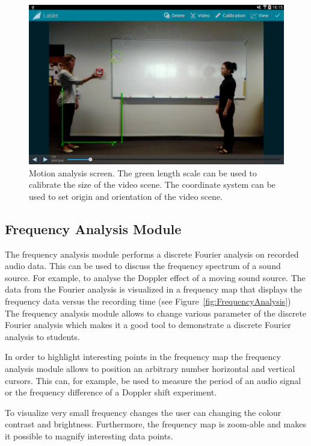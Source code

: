 \documentclass{sigchi}
\begin{document}
\begin{figure}
  \centering
  \includegraphics[width=.99\columnwidth]{MotionAnalysis}
  \caption{Motion analysis screen.
  The green length scale can be used to calibrate the size of the video scene.
  The coordinate system can be used to set origin and orientation of the video scene.\label{fig:MotionAnalysis}}
\end{figure}

\subsection{Frequency Analysis Module}
The frequency analysis module performs a discrete Fourier analysis on recorded audio data.
This can be used to discuss the frequency spectrum of a sound source.
For example, to analyse the Doppler effect of a moving sound source.
The data from the Fourier analysis is visualized in a frequency map that displays the frequency data versus the recording time (see Figure~\ref{fig:FrequencyAnalysis})
The frequency analysis module allows to change various parameter of the discrete Fourier analysis which makes it a good tool to demonstrate a discrete Fourier analysis to students.

In order to highlight interesting points in the frequency map the frequency analysis module allows to position an arbitrary number horizontal and vertical cursors.
This can, for example, be used to measure the period of an audio signal or the frequency difference of
a Doppler shift experiment.

To visualize very small frequency changes the user can changing the colour contrast and brightness.
Furthermore, the frequency map is zoom-able and makes it possible to magnify interesting data points.
\end{document}
